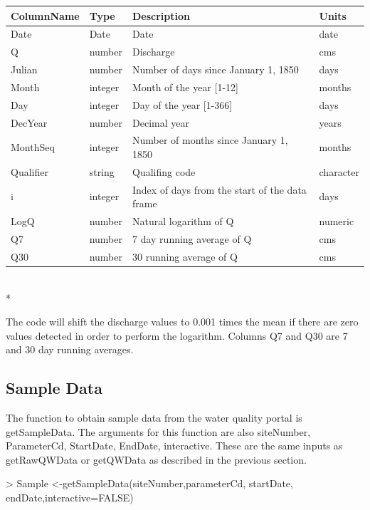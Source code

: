 \documentclass[a4paper,11pt]{article}
\begin{document}
\begin{tabular}{llll}
  \hline
ColumnName & Type & Description & Units \\ 
  \hline
Date & Date & Date & date \\ 
  Q & number & Discharge & cms \\ 
  Julian & number & Number of days since January 1, 1850 & days \\ 
  Month & integer & Month of the year [1-12] & months \\ 
  Day & integer & Day of the year [1-366] & days \\ 
  DecYear & number & Decimal year & years \\ 
  MonthSeq & integer & Number of months since January 1, 1850 & months \\ 
  Qualifier & string & Qualifing code & character \\ 
  i & integer & Index of days from the start of the data frame & days \\ 
  LogQ & number & Natural logarithm of Q & numeric \\ 
  Q7 & number & 7 day running average of Q & cms \\ 
  Q30 & number & 30 running average of Q & cms \\ 
   \hline
\end{tabular}\\*

The code will shift the discharge values to 0.001 times the mean if there are zero values detected in order to perform the logarithm. Columns Q7 and Q30 are 7 and 30 day running averages. 

\subsection{Sample Data}
The function to obtain sample data from the water quality portal is getSampleData. The arguments for this function are also siteNumber, ParameterCd, StartDate, EndDate, interactive. These are the same inputs as getRawQWData or getQWData as described in the previous section.

\begin{Schunk}
\begin{Sinput}
> Sample <-getSampleData(siteNumber,parameterCd,
       startDate, endDate,interactive=FALSE)
\end{Sinput}
\end{Schunk}
\end{document}
